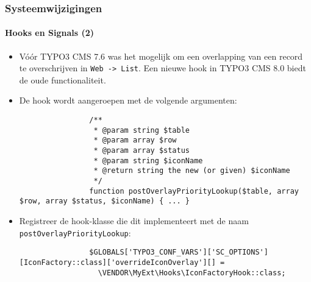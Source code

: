 \begin{frame}[fragile]
	\frametitle{Systeemwijzigingen}
	\framesubtitle{Hooks en Signals (2)}

	\lstset{basicstyle=\tiny\ttfamily}

	\begin{itemize}

		\item Vóór TYPO3 CMS 7.6 was het mogelijk om een overlapping van een record te overschrijven in \texttt{Web -> List}.
			Een nieuwe hook in TYPO3 CMS 8.0 biedt de oude functionaliteit.

		\item De hook wordt aangeroepen met de volgende argumenten:
			\begin{lstlisting}
				/**
				 * @param string $table
				 * @param array $row
				 * @param array $status
				 * @param string $iconName
				 * @return string the new (or given) $iconName
				 */
				function postOverlayPriorityLookup($table, array $row, array $status, $iconName) { ... }
			\end{lstlisting}

		\item Registreer de hook-klasse die dit implementeert met de naam \texttt{postOverlayPriorityLookup}:

			\begin{lstlisting}
				$GLOBALS['TYPO3_CONF_VARS']['SC_OPTIONS'][IconFactory::class]['overrideIconOverlay'][] =
				  \VENDOR\MyExt\Hooks\IconFactoryHook::class;
			\end{lstlisting}

	\end{itemize}

\end{frame}

